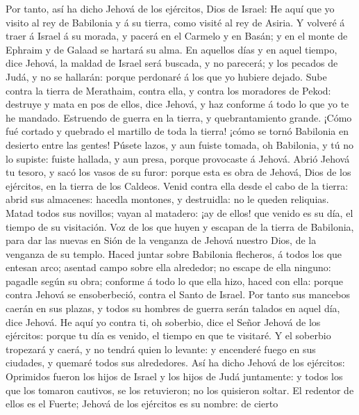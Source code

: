  Por tanto, así ha dicho Jehová de los ejércitos, Dios de
Israel: He aquí que yo visito al rey de Babilonia y á su tierra, como
visité al rey de Asiria.  Y volveré á traer á Israel á su
morada, y pacerá en el Carmelo y en Basán; y en el monte de Ephraim y de
Galaad se hartará su alma.  En aquellos días y en aquel
tiempo, dice Jehová, la maldad de Israel será buscada, y no parecerá; y
los pecados de Judá, y no se hallarán: porque perdonaré á los que yo
hubiere dejado.  Sube contra la tierra de Merathaim, contra
ella, y contra los moradores de Pekod: destruye y mata en pos de ellos,
dice Jehová, y haz conforme á todo lo que yo te he mandado.
 Estruendo de guerra en la tierra, y quebrantamiento
grande.  ¡Cómo fué cortado y quebrado el martillo de toda
la tierra! ¡cómo se tornó Babilonia en desierto entre las gentes!
 Púsete lazos, y aun fuiste tomada, oh Babilonia, y tú no
lo supiste: fuiste hallada, y aun presa, porque provocaste á Jehová.
 Abrió Jehová tu tesoro, y sacó los vasos de su furor:
porque esta es obra de Jehová, Dios de los ejércitos, en la tierra de
los Caldeos.  Venid contra ella desde el cabo de la tierra:
abrid sus almacenes: hacedla montones, y destruidla: no le queden
reliquias.  Matad todos sus novillos; vayan al matadero:
¡ay de ellos! que venido es su día, el tiempo de su visitación.
 Voz de los que huyen y escapan de la tierra de Babilonia,
para dar las nuevas en Sión de la venganza de Jehová nuestro Dios, de la
venganza de su templo.  Haced juntar sobre Babilonia
flecheros, á todos los que entesan arco; asentad campo sobre ella
alrededor; no escape de ella ninguno: pagadle según su obra; conforme á
todo lo que ella hizo, haced con ella: porque contra Jehová se
ensoberbeció, contra el Santo de Israel.  Por tanto sus
mancebos caerán en sus plazas, y todos su hombres de guerra serán
talados en aquel día, dice Jehová.  He aquí yo contra ti,
oh soberbio, dice el Señor Jehová de los ejércitos: porque tu día es
venido, el tiempo en que te visitaré.  Y el soberbio
tropezará y caerá, y no tendrá quien lo levante: y encenderé fuego en
sus ciudades, y quemaré todos sus alrededores.  Así ha
dicho Jehová de los ejércitos: Oprimidos fueron los hijos de Israel y
los hijos de Judá juntamente: y todos los que los tomaron cautivos, se
los retuvieron; no los quisieron soltar.  El redentor de
ellos es el Fuerte; Jehová de los ejércitos es su nombre: de cierto
